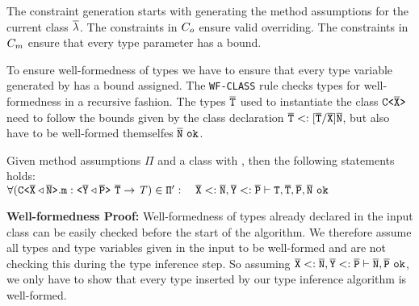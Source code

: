 
The constraint generation starts with generating the method assumptions for the current class $\overline{\mathtt{\lambda}}$.
The constraints in $C_o$ ensure valid overriding.
The constraints in $C_m$ ensure that every type parameter has a bound.

To ensure well-formedness of types we have to ensure that every type variable generated by \fjtype{} has a bound assigned.
The \texttt{WF-CLASS} rule checks types for well-formedness in a recursive fashion.
The types $\overline{\tt T}$ used to instantiate the class $\mathtt{C \texttt{<} \overline{\tt X} \texttt{>} }$ need to follow the bounds given by the class declaration $\overline{\tt T} <: [\overline{\tt T}/\overline{\tt X}]\overline{\tt N}$, but also have to be well-formed themselfes $\overline{\tt N}\ \texttt{ok}$.
\begin{lemma}\label{lemma:well-formedness}
  Given method assumptions $\Pi$ and a class  with
  ,
  then the following statements holds:\\
  \normalfont $\forall (\exptype{C}{\ol{X} \triangleleft \ol{N}}.\texttt{m} : \exptype{}{\ol{Y} \triangleleft \ol{P}}\ \ol{\type{T}} \to \itype{T}) \in \mv{\Pi}': \quad \ol{X} <: \ol{N}, \ol{Y} <: \ol{P} \vdash \type{T}, \ol{T}, \ol{P}, \ol{N}\ \texttt{ok}$
\end{lemma}
\textbf{Well-formedness Proof:}
Well-formedness of types already declared in the input class can be easily checked before the start of the \fjtype{} algorithm.
We therefore assume all types and type variables given in the input to be well-formed and are not checking this during the type inference step.
So assuming $\ol{X} <: \ol{N}, \ol{Y} <: \ol{P} \vdash \ol{N}, \ol{P}\ \texttt{ok}$, we only have to show that every type inserted by our type inference algorithm is well-formed.

